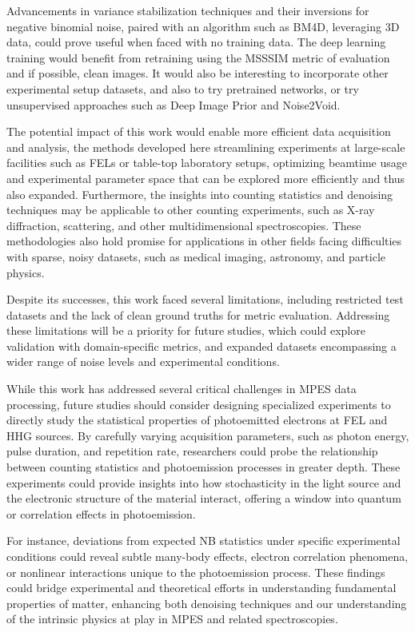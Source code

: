 Advancements in variance stabilization techniques and their inversions for negative binomial noise, paired with an algorithm such as BM4D, leveraging 3D data, could prove useful when faced with no training data. The deep learning training would benefit from retraining using the \gls{MSSSIM} metric of evaluation and if possible, clean images. It would also be interesting to incorporate other experimental setup datasets, and also to try pretrained networks, or try unsupervised approaches such as Deep Image Prior and Noise2Void.

The potential impact of this work would enable more efficient data acquisition and analysis, the methods developed here streamlining experiments at large-scale facilities such as \glspl{FEL} or table-top laboratory setups, optimizing beamtime usage and experimental parameter space that can be explored more efficiently and thus also expanded. Furthermore, the insights into counting statistics and denoising techniques may be applicable to other counting experiments, such as X-ray diffraction, scattering, and other multidimensional spectroscopies. These methodologies also hold promise for applications in other fields facing difficulties with sparse, noisy datasets, such as medical imaging, astronomy, and particle physics.

Despite its successes, this work faced several limitations, including restricted test datasets and the lack of clean ground truths for metric evaluation. Addressing these limitations will be a priority for future studies, which could explore validation with domain-specific metrics, and expanded datasets encompassing a wider range of noise levels and experimental conditions. 

While this work has addressed several critical challenges in \gls{MPES} data processing, future studies should consider designing specialized experiments to directly study the statistical properties of photoemitted electrons at FEL and \gls{HHG} sources. By carefully varying acquisition parameters, such as photon energy, pulse duration, and repetition rate, researchers could probe the relationship between counting statistics and photoemission processes in greater depth. These experiments could provide insights into how stochasticity in the light source and the electronic structure of the material interact, offering a window into quantum or correlation effects in photoemission.

For instance, deviations from expected NB statistics under specific experimental conditions could reveal subtle many-body effects, electron correlation phenomena, or nonlinear interactions unique to the photoemission process. These findings could bridge experimental and theoretical efforts in understanding fundamental properties of matter, enhancing both denoising techniques and our understanding of the intrinsic physics at play in \gls{MPES} and related spectroscopies.

